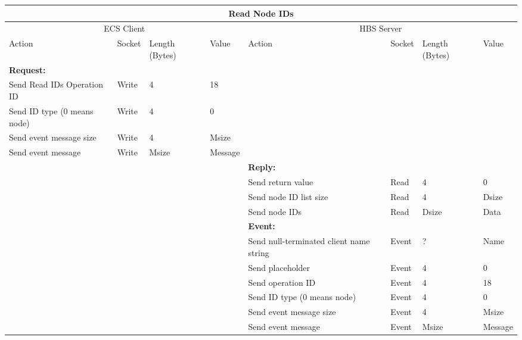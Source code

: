 \bigskip
\small
\begin{tabular}{|p{1.2in}|p{.4in}|p{.4in}|p{.5in}|p{1.2in}|p{.4in}|p{.4in}|p{.5in} |} \hline
\multicolumn{8}{|c|}{{\bf Read Node IDs}} \\ \hline
\multicolumn{4}{|c|}{ECS Client} & \multicolumn{4}{|c|}{HBS Server} \\ \hline
Action            & Socket & Length  
                            (Bytes)& Value & Action       & Socket & Length 
                                                                    (Bytes)& Value \\ \hline
\multicolumn{4}{|l}{{\bf Request:}}&\multicolumn{4}{|l|}{~} \\ \hline
Send Read IDs Operation ID  & Write  & 4     & 18     &              &        &       &       \\ \hline
Send ID type (0 means node)      & Write  & 4     &  0 &           &        &       &       \\ \hline
Send event
message size      & Write  & 4     &  Msize &         &        &       &       \\ \hline
Send event message
                  & Write  &  Msize  &  Message &     &        &       &       \\ \hline
\multicolumn{4}{|l}{~}&\multicolumn{4}{|l|}{{\bf Reply:}} \\ \hline
                  &        &       &       & Send return
                                             value        & Read   &  4    & 0       \\ \hline
                  &        &       &       & Send node ID list size & Read &  4    &  Dsize \\ \hline
                  &        &       &       & Send node IDs    & Read   & Dsize &  Data \\ \hline
\multicolumn{4}{|l}{~}&\multicolumn{4}{|l|}{{\bf Event:}} \\ \hline
                  &        &       &       & Send null-terminated client
                                             name string  & Event  &  ?    & Name  \\ \hline
                  &        &       &       & Send placeholder  & Event  &   4   &   0    \\  \hline
                  &        &       &       & Send operation 
                                             ID           & Event  &   4   &  18   \\ \hline
                  &        &       &       & Send ID type (0 means node)     & Event  &   4   &  0    \\ \hline
                  &        &       &       & Send event message
                                                  size    & Event  &   4   &  Msize \\ \hline
                  &        &       &       & Send event message
                                                          & Event  & Msize & Message  \\ \hline
\end{tabular}
\normalsize
\bigskip




